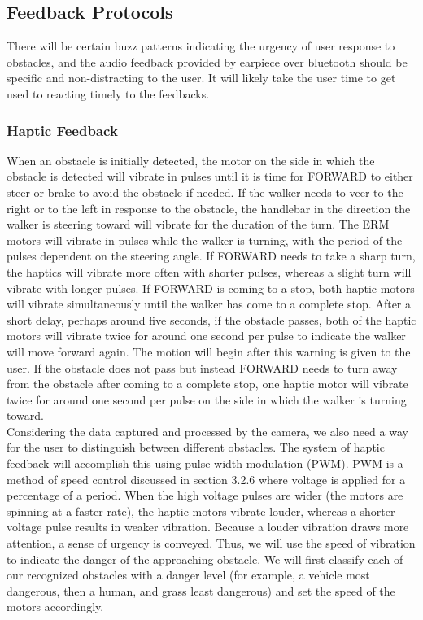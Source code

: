 \subsection{Feedback Protocols}
\noindent There will be certain buzz patterns indicating the urgency of user response to obstacles, and the audio feedback provided by earpiece over bluetooth should be specific and non-distracting to the user. It will likely take the user time to get used to reacting timely to the feedbacks.

\subsubsection{Haptic Feedback}
\noindent When an obstacle is initially detected, the motor on the side in which the obstacle is detected will vibrate in pulses until it is time for FORWARD to either steer or brake to avoid the obstacle if needed. If the walker needs to veer to the right or to the left in response to the obstacle, the handlebar in the direction the walker is steering toward will vibrate for the duration of the turn. The ERM motors will vibrate in pulses while the walker is turning, with the period of the pulses dependent on the steering angle. If FORWARD needs to take a sharp turn, the haptics will vibrate more often with shorter pulses, whereas a slight turn will vibrate with longer pulses. If FORWARD is coming to a stop, both haptic motors will vibrate simultaneously until the walker has come to a complete stop. After a short delay, perhaps around five seconds, if the obstacle passes, both of the haptic motors will vibrate twice for around one second per pulse to indicate the walker will move forward again. The motion will begin after this warning is given to the user. If the obstacle does not pass but instead FORWARD needs to turn away from the obstacle after coming to a complete stop, one haptic motor will vibrate twice for around one second per pulse on the side in which the walker is turning toward.\\ 

\noindent Considering the data captured and processed by the camera, we also need a way for the user to distinguish between different obstacles. The system of haptic feedback will accomplish this using pulse width modulation (PWM). PWM is a method of speed control discussed in section 3.2.6 where voltage is applied for a percentage of a period. When the high voltage pulses are wider (the motors are spinning at a faster rate), the haptic motors vibrate louder, whereas a shorter voltage pulse results in weaker vibration. Because a louder vibration draws more attention, a sense of urgency is conveyed. Thus, we will use the speed of vibration to indicate the danger of the approaching obstacle. We will first classify each of our recognized obstacles with a danger level (for example, a vehicle most dangerous, then a human, and grass least dangerous) and set the speed of the motors accordingly.\\

